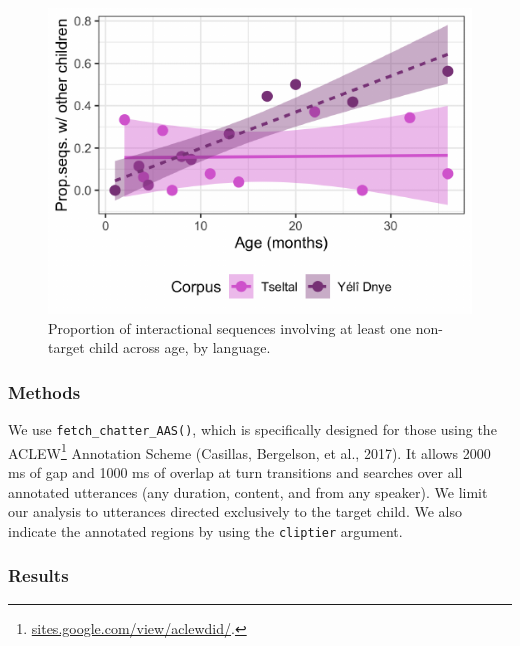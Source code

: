 \documentclass[10pt, letterpaper]{article}
\newenvironment{CodeChunk}{}{}
\begin{document}
\begin{CodeChunk}
\begin{figure}[h!]

{\centering \includegraphics{figs/tseyel.is.fig-1} 

}

\caption[Proportion of interactional sequences involving at least one non-target child across age, by language]{Proportion of interactional sequences involving at least one non-target child across age, by language.}\label{fig:tseyel.is.fig}
\end{figure}
\end{CodeChunk}

\hypertarget{methods}{%
\subsubsection{Methods}\label{methods}}

We use \texttt{fetch\_chatter\_AAS()}, which is specifically designed
for those using the ACLEW\footnote{\href{https://sites.google.com/view/aclewdid/home}{sites.google.com/view/aclewdid/}.}
Annotation Scheme (Casillas, Bergelson, et al., 2017). It allows 2000 ms
of gap and 1000 ms of overlap at turn transitions and searches over all
annotated utterances (any duration, content, and from any speaker). We
limit our analysis to utterances directed exclusively to the target
child. We also indicate the annotated regions by using the
\texttt{cliptier} argument.

\hypertarget{results}{%
\subsubsection{Results}\label{results}}
\end{document}
